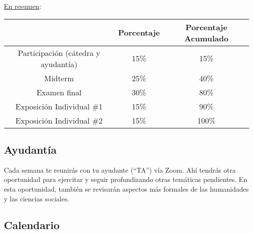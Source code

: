 \documentclass[letterpaper]{article}
\begin{document}
\underline{En resumen}:

\begin{table}[h]
\begin{tabular}{ccc}
							& \textbf{Porcentaje} & {\bf Porcentaje Acumulado} \\
							\hline
Participaci\'on (c\'atedra y ayudant\'ia) & 15\%       & 15\%                 \\
\hline
Midterm 				& 25\% & 40\%                 \\
Examen final 		& 30\% & 80\%                 \\
\hline
Exposici\'on Individual \#1 	& 15\% & 90\%    \\
Exposici\'on Individual \#2 	& 15\% & 100\%    \\
\hline             
\end{tabular}
\end{table}

\subsection*{Ayudant\'ia}

Cada semana te reunir\'as con tu ayudante (``TA'') v\'ia Zoom. Ah\'i tendr\'as otra oportunidad para ejercitar y seguir profundizando otras tem\'aticas pendientes. En esta oportunidad, tambi\'en se revisar\'an aspectos m\'as formales de las humanidades y las ciencias sociales. 


\subsection*{Calendario}
\end{document}
